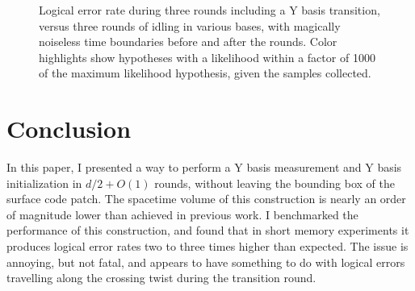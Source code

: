 \documentclass[onecolumn,unpublished,a4paper]{quantumarticle}
\theoremstyle{definition}
\theoremstyle{definition}
\theoremstyle{definition}
\begin{document}
\begin{figure}
    \centering
    \caption{
        Logical error rate during three rounds including a Y basis transition, versus three rounds of idling in various bases, with magically noiseless time boundaries before and after the rounds.
        Color highlights show hypotheses with a likelihood within a factor of 1000 of the maximum likelihood hypothesis, given the samples collected.
    }
    \label{fig:round_error_rate}
\end{figure}


\section{Conclusion}
\label{sec:conclusion}

In this paper, I presented a way to perform a Y basis measurement and Y basis initialization in $d/2 + O(1)$ rounds, without leaving the bounding box of the surface code patch.
The spacetime volume of this construction is nearly an order of magnitude lower than achieved in previous work.
I benchmarked the performance of this construction, and found that in short memory experiments it produces logical error rates two to three times higher than expected.
The issue is annoying, but not fatal, and appears to have something to do with logical errors travelling along the crossing twist during the transition round.
\end{document}
